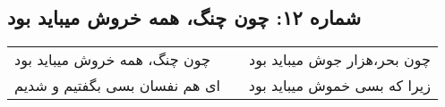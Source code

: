 \begin{center}
\section*{شماره ۱۲: چون چنگ، همه خروش میباید بود}
\label{sec:012}
\begin{longtable}{l p{0.5cm} r}
چون چنگ، همه خروش میباید بود
&&
چون بحر،‌هزار جوش میباید بود
\\
ای هم نفسان بسی بگفتیم و شدیم
&&
زیرا که بسی خموش میباید بود
\\
\end{longtable}
\end{center}
